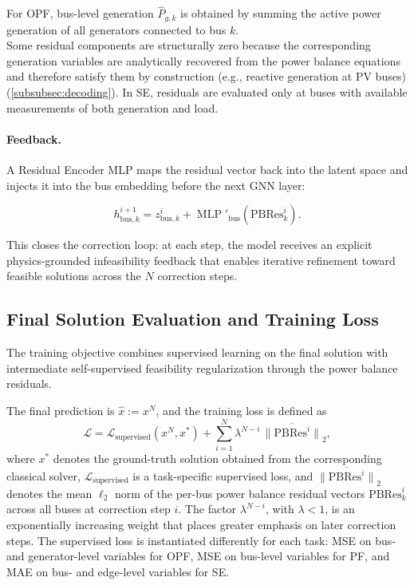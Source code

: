 For OPF, bus-level generation $\hat{P}_{g,k}$ is obtained by summing the active power generation of all generators connected to bus $k$.\\

Some residual components are structurally zero because the corresponding generation variables are analytically recovered from the power balance equations and therefore satisfy them by construction (e.g., reactive generation at PV buses) (\cref{subsubsec:decoding}). In SE, residuals are evaluated only at buses with available measurements of both generation and load.

\paragraph{Feedback.}
A Residual Encoder MLP maps the residual vector back into the latent space and injects it into the bus embedding before the next GNN layer:

\begin{equation}
h_{\mathrm{bus},k}^{i+1}
=
z_{\mathrm{bus},k}^i
+
\operatorname{MLP}'_{\mathrm{bus}}
\left(
\mathrm{PBRes}_k^i
\right).
\end{equation}

This closes the correction loop: at each step, the model receives an explicit
physics-grounded infeasibility feedback that enables iterative refinement toward
feasible solutions across the $N$ correction steps.

\subsection{Final Solution Evaluation and Training Loss}
\label{subsec:eval}


The training objective combines supervised learning on the final solution with
intermediate self-supervised feasibility regularization through the power balance residuals.

The final prediction is $\hat{x} := x^N$, and the training loss is defined as
\begin{equation}
\label{eq:loss}
\mathcal{L}
=
\mathcal{L}_{\mathrm{supervised}}(x^N, x^*)
+
\sum_{i=1}^{N}
\lambda^{N-i}
\,
\overline{\|\mathrm{PBRes}^i\|}_2,
\end{equation}
where $x^*$ denotes the ground-truth solution obtained from the corresponding classical solver,
$\mathcal{L}_{\mathrm{supervised}}$ is a task-specific supervised loss, and $\overline{\|\mathrm{PBRes}^i\|}_2$ denotes the mean $\ell_2$ norm of the per-bus power balance residual vectors $\mathrm{PBRes}_k^i$ across all buses at correction step $i$. The factor $\lambda^{N-i}$, with $\lambda<1$, is an exponentially increasing weight that places greater emphasis on later correction steps.
The supervised loss is instantiated differently for each task:
MSE on bus- and generator-level variables for OPF,
MSE on bus-level variables for PF,
and MAE on bus- and edge-level variables for SE.\\

